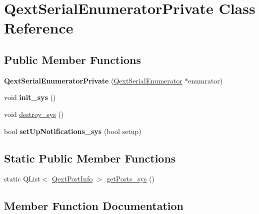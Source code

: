 \hypertarget{class_qext_serial_enumerator_private}{}\section{Qext\+Serial\+Enumerator\+Private Class Reference}
\label{class_qext_serial_enumerator_private}
\subsection*{Public Member Functions}
\begin{DoxyCompactItemize}
\item 
\mbox{\label{class_qext_serial_enumerator_private_a714bb9552eaa3ece89809fa97ac3686e}} 
{\bfseries Qext\+Serial\+Enumerator\+Private} (\mbox{\hyperlink{class_qext_serial_enumerator}{Qext\+Serial\+Enumerator}} $\ast$enumrator)
\item 
\mbox{\label{class_qext_serial_enumerator_private_a6b4217065fdf67e27747fa1e5a8c7bd9}} 
void {\bfseries init\+\_\+sys} ()
\item 
void \mbox{\hyperlink{class_qext_serial_enumerator_private_a60072f686e6296623fda79486523e619}{destroy\+\_\+sys}} ()
\item 
\mbox{\label{class_qext_serial_enumerator_private_a9c742e7ebf51bdc9dfab547a2f6653a3}} 
bool {\bfseries set\+Up\+Notifications\+\_\+sys} (bool setup)
\end{DoxyCompactItemize}
\subsection*{Static Public Member Functions}
\begin{DoxyCompactItemize}
\item 
static Q\+List$<$ \mbox{\hyperlink{struct_qext_port_info}{Qext\+Port\+Info}} $>$ \mbox{\hyperlink{class_qext_serial_enumerator_private_a0585eec8e37995f951f0d2016c7bd648}{get\+Ports\+\_\+sys}} ()
\end{DoxyCompactItemize}


\subsection{Member Function Documentation}
\mbox{\label{class_qext_serial_enumerator_private_a60072f686e6296623fda79486523e619}} 
